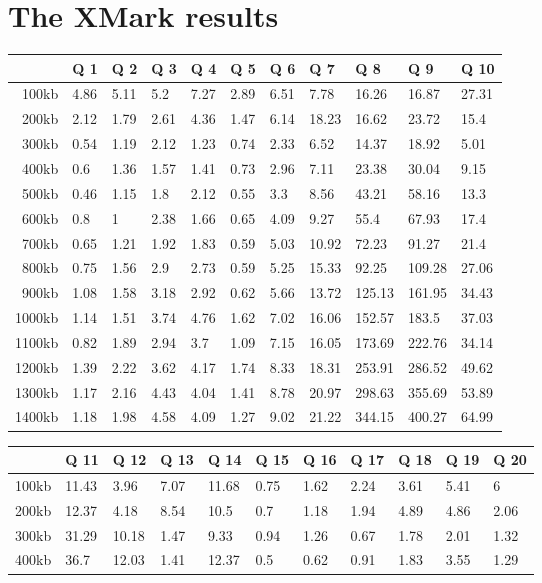 \chapter{The XMark results}
\label{app:the-xmark-results}
\begin {table}[htpb]
\centering
\begin{tabular}{r|l|l|l|l|l|l|l|l|l|l}
&Q 1&Q 2&Q 3&Q 4&Q 5&Q 6&Q 7&Q 8&Q 9&Q 10\\
\hline
100kb&4.86&5.11&5.2&7.27&2.89&6.51&7.78&16.26&16.87&27.31\\
200kb&2.12&1.79&2.61&4.36&1.47&6.14&18.23&16.62&23.72&15.4\\
300kb&0.54&1.19&2.12&1.23&0.74&2.33&6.52&14.37&18.92&5.01\\
400kb&0.6&1.36&1.57&1.41&0.73&2.96&7.11&23.38&30.04&9.15\\
500kb&0.46&1.15&1.8&2.12&0.55&3.3&8.56&43.21&58.16&13.3\\
600kb&0.8&1&2.38&1.66&0.65&4.09&9.27&55.4&67.93&17.4\\
700kb&0.65&1.21&1.92&1.83&0.59&5.03&10.92&72.23&91.27&21.4\\
800kb&0.75&1.56&2.9&2.73&0.59&5.25&15.33&92.25&109.28&27.06\\
900kb&1.08&1.58&3.18&2.92&0.62&5.66&13.72&125.13&161.95&34.43\\
1000kb&1.14&1.51&3.74&4.76&1.62&7.02&16.06&152.57&183.5&37.03\\
1100kb&0.82&1.89&2.94&3.7&1.09&7.15&16.05&173.69&222.76&34.14\\
1200kb&1.39&2.22&3.62&4.17&1.74&8.33&18.31&253.91&286.52&49.62\\
1300kb&1.17&2.16&4.43&4.04&1.41&8.78&20.97&298.63&355.69&53.89\\
1400kb&1.18&1.98&4.58&4.09&1.27&9.02&21.22&344.15&400.27&64.99\\
\end{tabular}
\newline
\vspace*{0.5 cm}
\newline
\begin{tabular}{r|l|l|l|l|l|l|l|l|l|l}
&Q 11&Q 12&Q 13&Q 14&Q 15&Q 16&Q 17&Q 18&Q 19&Q 20\\
\hline
100kb&11.43&3.96&7.07&11.68&0.75&1.62&2.24&3.61&5.41&6\\
200kb&12.37&4.18&8.54&10.5&0.7&1.18&1.94&4.89&4.86&2.06\\
300kb&31.29&10.18&1.47&9.33&0.94&1.26&0.67&1.78&2.01&1.32\\
400kb&36.7&12.03&1.41&12.37&0.5&0.62&0.91&1.83&3.55&1.29\\

\end{tabular}
\end{table}
